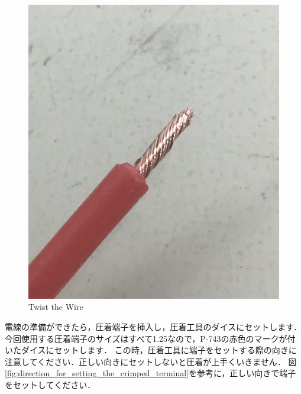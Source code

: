 \documentclass[{../../master}]{subfiles}
\begin{document}
\begin{figure}[ht]
  \centering
  \includegraphics[height=50truemm]{images/twist_the_wire.jpg}
  \caption{Twist the Wire}
  \label{fig:twist_the_wire}
\end{figure}

電線の準備ができたら，圧着端子を挿入し，圧着工具のダイスにセットします．
今回使用する圧着端子のサイズはすべて1.25なので，P-743の赤色のマークが付いたダイスにセットします．
この時，圧着工具に端子をセットする際の向きに注意してください．正しい向きにセットしないと圧着が上手くいきません．
図\ref{fig:direction_for_setting_the_crimped_terminal}を参考に，正しい向きで端子をセットしてください．
\end{document}
